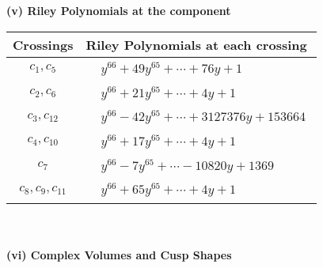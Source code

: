 \documentclass[1p]{elsarticle_modified}
\theoremstyle{definition}
\begin{document}
\newpage\renewcommand{\arraystretch}{1}
\flushleft \textbf{(v) Riley Polynomials at the component}\newline \\
\begin{tabular}{m{50pt}|m{274pt}}
Crossings & \hspace{64pt}Riley Polynomials at each crossing \\
\hline $$\begin{aligned}c_{1},c_{5}\end{aligned}$$&$\begin{aligned}
&y^{66}+49 y^{65}+\cdots+76 y+1
\end{aligned}$\\
\hline $$\begin{aligned}c_{2},c_{6}\end{aligned}$$&$\begin{aligned}
&y^{66}+21 y^{65}+\cdots+4 y+1
\end{aligned}$\\
\hline $$\begin{aligned}c_{3},c_{12}\end{aligned}$$&$\begin{aligned}
&y^{66}-42 y^{65}+\cdots+3127376 y+153664
\end{aligned}$\\
\hline $$\begin{aligned}c_{4},c_{10}\end{aligned}$$&$\begin{aligned}
&y^{66}+17 y^{65}+\cdots+4 y+1
\end{aligned}$\\
\hline $$\begin{aligned}c_{7}\end{aligned}$$&$\begin{aligned}
&y^{66}-7 y^{65}+\cdots-10820 y+1369
\end{aligned}$\\
\hline $$\begin{aligned}c_{8},c_{9},c_{11}\end{aligned}$$&$\begin{aligned}
&y^{66}+65 y^{65}+\cdots+4 y+1
\end{aligned}$\\
\hline
\end{tabular}\\~\\
\newpage\flushleft \textbf{(vi) Complex Volumes and Cusp Shapes}
\end{document}
